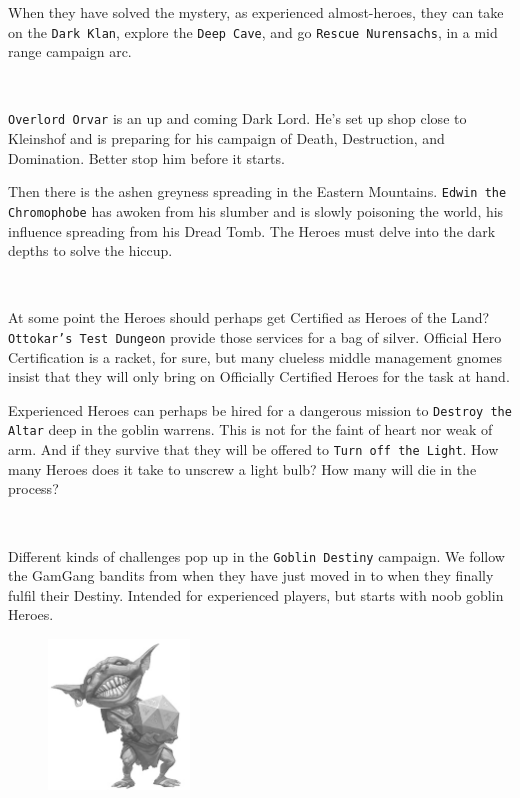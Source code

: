 When they have solved the mystery, as experienced almost-heroes, they can take on the \texttt{Dark Klan}, explore the \texttt{Deep Cave}, and go \texttt{Rescue Nurensachs}, in a mid range campaign arc.

\

\noindent
\texttt{Overlord Orvar} is an up and coming Dark Lord. He's set up shop close to Kleinshof and is preparing for his campaign of Death, Destruction, and Domination. Better stop him before it starts.

Then there is the ashen greyness spreading in the Eastern Mountains. \texttt{Edwin the Chromophobe} has awoken from his slumber and is slowly poisoning the world, his influence spreading from his Dread Tomb. The Heroes must delve into the dark depths to solve the hiccup.

\

\noindent
At some point the Heroes should perhaps get Certified as Heroes of the Land? \texttt{Ottokar's Test Dungeon} provide those services for a bag of silver. Official Hero Certification is a racket, for sure, but many clueless middle management gnomes insist that they will only bring on Officially Certified Heroes for the task at hand.

Experienced Heroes can perhaps be hired for a dangerous mission to \texttt{Destroy the Altar} deep in the goblin warrens. This is not for the faint of heart nor weak of arm. And if they survive that they will be offered to \texttt{Turn off the Light}. How many Heroes does it take to unscrew a light bulb? How many will die in the process?

\

\noindent
Different kinds of challenges pop up in the \texttt{Goblin Destiny} campaign. We follow the GamGang bandits from when they have just moved in to when they finally fulfil their Destiny. Intended for experienced players, but starts with noob goblin Heroes.

\begin{figure}[b]
\centering
\includegraphics[height=40mm]{./fig/dicegoblin.jpg}
\end{figure}







